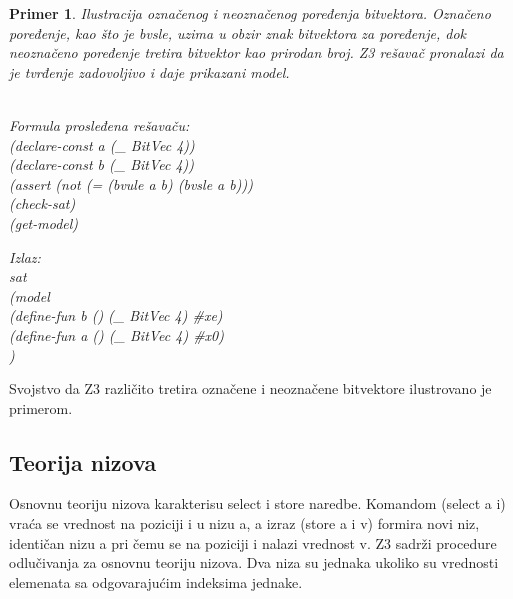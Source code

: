 \documentclass[12pt,oneside]{memoir}
\newtheorem{primer}{Primer}
\begin{document}
\begin{primer} Ilustracija označenog i neoznačenog poređenja bitvektora. Označeno poređenje, kao što je bvsle, uzima u obzir znak bitvektora za poređenje, dok neoznačeno poređenje tretira bitvektor kao prirodan broj. Z3 rešavač pronalazi da je tvrđenje zadovoljivo i daje prikazani model.
\\ \\
\begin{minipage}[b]{0.5\textwidth}
Formula prosleđena rešavaču:
\\(declare-const a (\_ BitVec 4))
\\(declare-const b (\_ BitVec 4))
\\(assert (not (= (bvule a b) (bvsle a b)))
\\(check-sat)
\\(get-model)
\end{minipage}
\hspace{1.15cm} 
\begin{minipage}[t]{0.5\textwidth}
\vspace{-3.4cm}
Izlaz:
\\sat 
\\(model 
\\(define-fun b () (\_ BitVec 4) \#xe) 
\\(define-fun a () (\_ BitVec 4) \#x0)
\\)
\end{minipage}


\end{primer}
Svojstvo da Z3 različito tretira označene i neoznačene bitvektore ilustrovano je  primerom.
 

    



\subsection{Teorija nizova} 
Osnovnu teoriju nizova karakterisu select i store naredbe. 
Komandom (select a i) vraća se vrednost na poziciji i u nizu a, a izraz (store a i v) formira novi niz, identičan nizu a pri čemu se na poziciji i nalazi vrednost v.
Z3 sadrži procedure odlučivanja za osnovnu teoriju nizova.
Dva niza su jednaka ukoliko su vrednosti elemenata sa odgovarajućim indeksima jednake.
 
\end{document}

